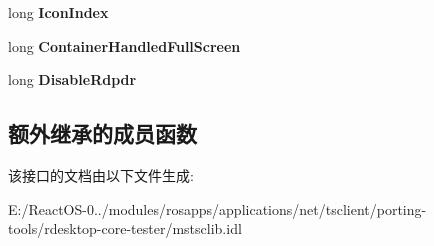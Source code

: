\begin{DoxyCompactItemize}
long {\bfseries Icon\+Index}
\item 
\mbox{\label{interface_m_s_t_s_c_lib_1_1_i_ms_tsc_advanced_settings_ab07488d9a53a7d33a31e7b706e79b6c0}} 
long {\bfseries Container\+Handled\+Full\+Screen}
\item 
\mbox{\label{interface_m_s_t_s_c_lib_1_1_i_ms_tsc_advanced_settings_ab445f5376e10ca2db446daacf84dd22c}} 
long {\bfseries Disable\+Rdpdr}
\end{DoxyCompactItemize}
\subsection*{额外继承的成员函数}


该接口的文档由以下文件生成\+:\begin{DoxyCompactItemize}
\item 
E\+:/\+React\+O\+S-\/0../modules/rosapps/applications/net/tsclient/porting-\/tools/rdesktop-\/core-\/tester/mstsclib.\+idl\end{DoxyCompactItemize}

